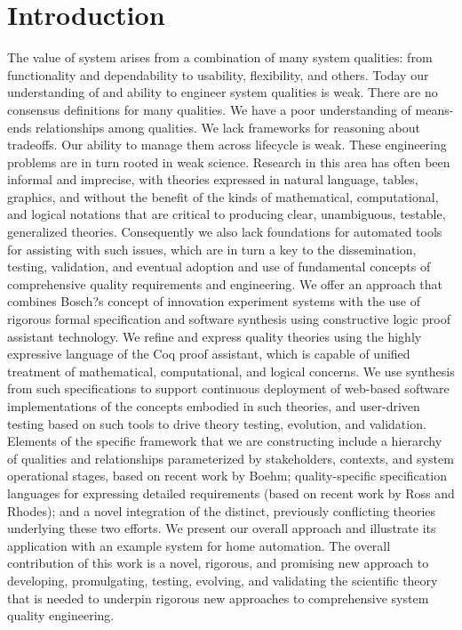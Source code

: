 \documentclass[conference]{IEEEtran}
\begin{document}
\IEEEpeerreviewmaketitle

\section{Introduction}
The value of system arises from a combination of many system qualities: from functionality and dependability to usability, flexibility, and others. Today our understanding of and ability to engineer system qualities is weak. There are no consensus definitions for many qualities. We have a poor understanding of means-ends relationships among qualities. We lack frameworks for reasoning about tradeoffs. Our ability to manage them across lifecycle is weak. These engineering problems are in turn rooted in weak science. Research in this area has often been informal and imprecise, with theories expressed in natural language, tables, graphics, and without the benefit of the kinds of mathematical, computational, and logical notations that are critical to producing clear, unambiguous, testable, generalized theories. Consequently we also lack foundations for automated tools for assisting with such issues, which are in turn a key to the dissemination, testing, validation, and eventual adoption and use of fundamental concepts of comprehensive quality requirements and engineering. We offer an approach that combines Bosch?s concept of innovation experiment systems with the use of rigorous formal specification and software synthesis using constructive logic proof assistant technology. We refine and express quality theories using the highly expressive language of the Coq proof assistant, which is capable of unified treatment of mathematical, computational, and logical concerns. We use synthesis from such specifications to support continuous deployment of web-based software implementations of the concepts embodied in such theories, and  user-driven testing based on such tools to drive theory testing, evolution, and validation.  Elements of the specific framework that we are constructing include a hierarchy of qualities and relationships parameterized by stakeholders, contexts, and system operational stages, based on recent work by Boehm; quality-specific specification languages for expressing detailed requirements (based on recent work by Ross and Rhodes); and a novel integration of the distinct, previously conflicting theories underlying these two efforts. We present our overall approach and illustrate its application with an example system for home automation. The overall contribution of this work is a novel, rigorous, and promising new approach to developing, promulgating, testing, evolving, and validating the scientific theory that is needed to underpin rigorous new approaches to comprehensive system quality engineering.
\end{document}
